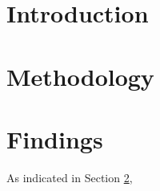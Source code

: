 \documentclass{article}
\begin{document}
\section{Introduction}
\label{sec:intro}
\lipsum[1]


\section{Methodology}
\label{sec:methods}
\lipsum[2]

\section{Findings}
As indicated in Section \ref{sec:methods}, \lipsum[3][2]
\end{document}
